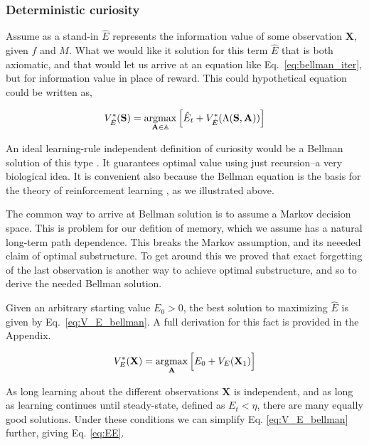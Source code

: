 \subsubsection{Deterministic curiosity}
Assume as a stand-in $\hat E$ represents the information value of some observation $\mathbf{X}$, given $f$ and $M$. What we would like it solution for this term $\hat E$ that is both axiomatic, and that would let us arrive at an equation like Eq.~\ref{eq:bellman_iter}, but for information value in place of reward. This could hypothetical equation could be written as, 

\begin{equation} 
	\label{eq:bellman_iter_E}
	V^*_{\hat E}(\mathbf{S}) = \operatorname*{argmax}_{\mathbf{A} \in \mathbb{A}} \Big [ \hat E_{t}  + V^*_{\hat E}(\Lambda(\mathbf{S},\mathbf{A})) \Big ]
\end{equation}

An ideal learning-rule independent definition of curiosity would be a Bellman solution of this type \citep{Bellmann1954}. It guarantees optimal value using just recursion--a very biological idea. It is convenient also because the Bellman equation is the basis for the theory of reinforcement learning \citep{Sutton2018}, as we illustrated above. 

The common way to arrive at Bellman solution is to assume a Markov decision space. This is problem for our defition of memory, which we assume has a natural long-term path dependence. This breaks the Markov assumption, and its neeeded claim of optimal substructure. To get around this we proved that exact forgetting of the last observation is another way to achieve optimal substructure, and so to derive the needed Bellman solution.


Given an arbitrary starting value $E_0 > 0$, the best solution to maximizing $\hat E$ is given by Eq.~\ref{eq:V_E_bellman}. A full derivation for this fact is provided in the Appendix. 


\begin{equation}
	\label{eq:V_E_bellman} 
	V_E^{*}(\mathbf{X}) = \operatorname*{argmax}_{\mathbf{A}} \Big [ E_0 + V_E(\mathbf{X}_1) \Big ]
\end{equation}

As long learning about the different observations $\mathbf{X}$ is independent, and as long as learning continues until steady-state, defined as $E_t < \eta$, there are many equally good solutions. Under these conditions we can simplify Eq. \ref{eq:V_E_bellman} further, giving Eq. \ref{eq:EE}. 

